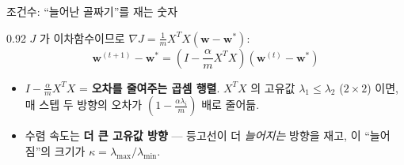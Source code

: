 \begin{frame}{조건수: ``늘어난 골짜기''를 재는 숫자}
\begin{center}\begin{varwidth}{0.92\textwidth}
  $J$ 가 이차함수이므로 $\nabla J = \frac{1}{m}X^TX(\boldsymbol{w} - \boldsymbol{w}^{*})$:
  \[
  \boldsymbol{w}^{(t+1)} - \boldsymbol{w}^{*} = \left(I - \frac{\alpha}{m}X^TX\right)(\boldsymbol{w}^{(t)} - \boldsymbol{w}^{*})
  \]
  \begin{itemize}
    \item $I - \frac{\alpha}{m}X^TX$ = \textbf{오차를 줄여주는 곱셈
      행렬}. $X^TX$ 의 고유값 $\lambda_1 \le \lambda_2$ ($2 \times 2$)
      이면, 매 스텝 두 방향의 오차가 $(1 - \frac{\alpha \lambda_i}{m})$
      배로 줄어듦.
    \item 수렴 속도는 \textbf{더 큰 고유값 방향} --- 등고선이 더
      \emph{늘어지는} 방향을 재고, 이 ``늘어짐''의 크기가 
      $\kappa = \lambda_{\max}/\lambda_{\min}$.
  \end{itemize}
\end{varwidth}\end{center}
\end{frame}

